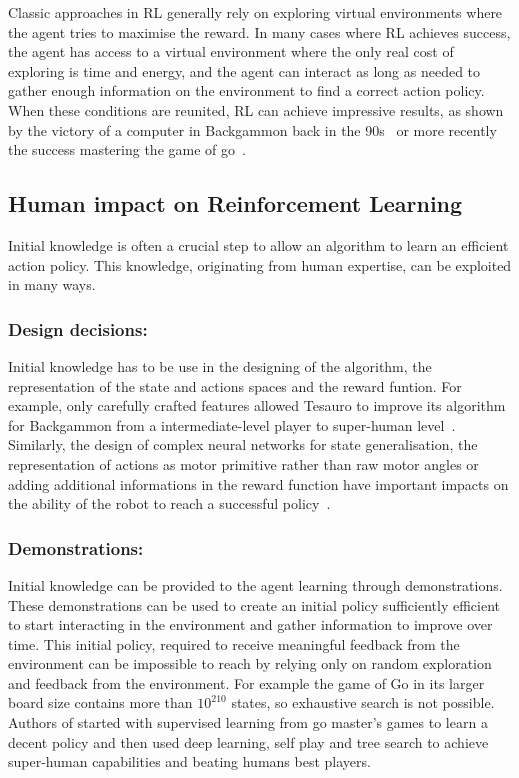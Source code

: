 \documentclass[letterpaper]{article} %
\begin{document}
Classic approaches in RL generally rely on exploring virtual environments where the agent
tries to maximise the reward. In many cases where RL achieves success, the agent
has access to a virtual environment where the only real cost of exploring is 
time and energy, and the agent can interact as long as needed to gather
enough information on the environment to find a correct action policy. When
these conditions are reunited, RL can achieve impressive results, as shown by
the victory of a computer in Backgammon back in the
90s~\cite{tesauro1995temporal} or more recently the success mastering the game
of go~\cite{silver2016mastering}.

\subsection{Human impact on Reinforcement Learning}

Initial knowledge is often a crucial step to allow an algorithm to learn an
efficient action policy. This knowledge, originating from human expertise, can
be exploited in many ways. 

\subsubsection{Design decisions:}
Initial knowledge has to be use in the designing of the algorithm, the
representation of the state and actions spaces and the reward funtion. For
example, only carefully crafted features allowed
Tesauro to improve its algorithm for Backgammon from a intermediate-level player
to super-human level~\cite{tesauro1995temporal}. Similarly, the design of
complex neural networks for state generalisation, the representation of actions
as motor primitive rather than raw motor angles or adding additional
informations in the reward function have important impacts on the ability of
the robot to reach a successful policy~\cite{kober2013reinforcement}.

\subsubsection{Demonstrations:}
Initial knowledge can be provided to the agent learning through demonstrations.
These demonstrations can be used to create an initial policy sufficiently
efficient to start interacting in the environment and gather information to
improve over time. This initial policy, required to receive meaningful feedback
from the environment can be impossible to reach by relying only on random
exploration and feedback from the environment. For example the game of Go in its larger board
size contains more than $10^{210}$ states, so exhaustive search is not possible.
Authors of \cite{silver2016mastering} started with
supervised learning from go master's games to learn a decent policy and then
used deep learning, self play and tree search to achieve super-human
capabilities and beating humans best players.
\end{document}
